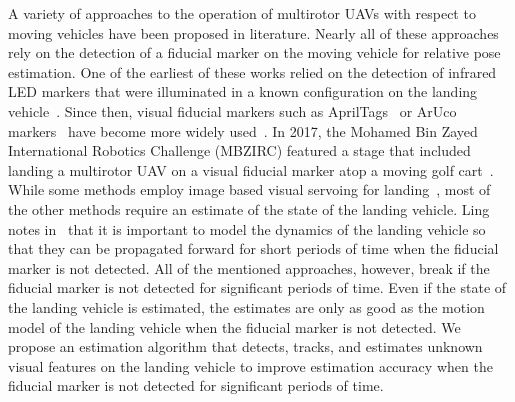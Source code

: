 A variety of approaches to the operation of multirotor UAVs with respect to
moving vehicles have been proposed in literature. Nearly all of these approaches rely on the
detection of a fiducial marker on the moving vehicle for relative pose
estimation. One of the earliest of
these works relied on the detection of infrared LED markers that were
illuminated in a known configuration on the landing
vehicle~\cite{wenzel2011automatic}. Since then, visual fiducial markers such as
AprilTags~\cite{olson2011tags} or ArUco markers~\cite{garrido2016generation}
have become more widely
used~\cite{ling2014precision,borowczyk2017autonomous,marantos2018vision,
araar2017vision}.
In 2017, the Mohamed Bin Zayed International Robotics Challenge (MBZIRC)
featured a stage that included landing a multirotor UAV on a visual fiducial
marker atop a moving golf
cart~\cite{baca2019autonomous,falanga2017vision,beul2017fast,cantelli2017autonomous}.
While some methods employ image based visual servoing for
landing~\cite{lee2012autonomous,wynn2019visual}, most of the other methods
require an estimate of the state of the landing vehicle.
Ling notes in~\cite{ling2014precision} that it is important to model the
dynamics of the landing vehicle so that they can be propagated forward for short
periods of time when the fiducial marker is not
detected. All of the mentioned
approaches, however, break if the fiducial marker is not detected for
significant periods of time.
Even if the state of the landing vehicle is estimated, the estimates are only as
good as the
motion model of the landing vehicle when the fiducial marker is not detected. We propose an estimation algorithm that detects,
tracks, and estimates unknown visual features on the landing vehicle to improve
estimation accuracy when the fiducial marker is not detected for significant
periods of time.

